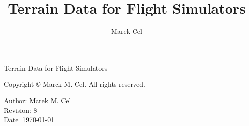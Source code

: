 \documentclass[12pt,a4paper]{report}
\title{Terrain Data for Flight Simulators}
\author{Marek Cel}
\date{}
\begin{document}
  
  \begin{titlepage}
    \centering
    {\huge Terrain Data for Flight Simulators\par}
  \end{titlepage}
  

  \noindent Copyright \copyright{} \the\year{} Marek M. Cel. All rights reserved.

  \noindent Author: Marek M. Cel \\
  Revision: 8 \\
  Date: \today

  
  
  {
    \clearpage
    \setlength{\parskip}{0em}
    \tableofcontents
  }

  
  
  
  
  
  \clearpage
   
  
  
\end{document}
